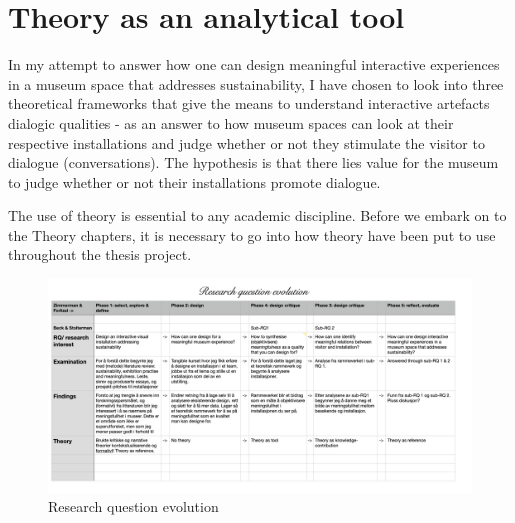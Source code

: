 \section*{Theory as an analytical tool}
In my attempt to answer how one can design meaningful interactive experiences in a museum space that addresses sustainability, I have chosen to look into three theoretical frameworks that give the means to understand interactive artefacts dialogic qualities - as an answer to how museum spaces can look at their respective installations and judge whether or not they stimulate the visitor to dialogue (conversations). The hypothesis is that there lies value for the museum to judge whether or not their installations promote dialogue. 

The use of theory is essential to any academic discipline. Before we embark on to the Theory chapters, it is necessary to go into how theory have been put to use throughout the thesis project. 

\begin{figure}[H]
\includegraphics[width=21cm, angle=90]{pictures/process/rq_evolution.png}
\caption{Research question evolution}
\centering 
\end{figure}
